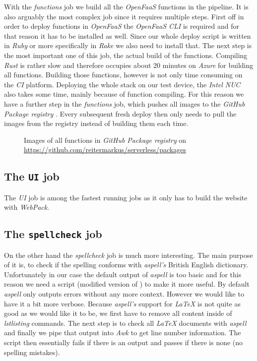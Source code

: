 With the \textit{functions} job we build all the \textit{OpenFaaS} functions in the pipeline. It is
also arguably the most complex job since it requires multiple steps. First off in order to deploy
functions in \textit{OpenFaaS} the \textit{OpenFaaS CLI} \cite{faas-cli} is required and for that
reason it has to be installed as well. Since our whole deploy script is written in \textit{Ruby} or
more specifically in \textit{Rake} we also need to install that. The next step is the most important
one of this job, the actual build of the functions. Compiling \textit{Rust} is rather slow and
therefore occupies about 20 minutes on \textit{Azure} for building all functions. Building those
functions, however is not only time consuming on the \textit{CI} platform. Deploying the whole stack
on our test device, the \textit{Intel NUC} also takes some time, mainly because of function
compiling. For this reason we have a further step in the \textit{functions} job, which pushes all
images to the \textit{GitHub Package registry} \cite{github-registry}. Every subsequent fresh deploy
then only needs to pull the images from the registry instead of building them each time.

\begin{figure}[H]
  \centering
  \caption{Images of all functions in \textit{GitHub Package registry} on \url{https://github.com/reitermarkus/serverless/packages}}
\end{figure}

\subsection{The \texttt{UI} job}

The \textit{UI} job is among the fastest running jobs as it only has to build the website with
\textit{WebPack}.

\subsection{The \texttt{spellcheck} job}

On the other hand the \textit{spellcheck} job is much more interesting. The main purpose of it is,
to check if the spelling conforms with \textit{aspell's} British English dictionary. Unfortunately
in our case the default output of \textit{aspell} is too basic and for this reason we need a script
(modified version of \cite{aspell-awk}) to make it more useful. By default \textit{aspell} only
outputs errors without any more context. However we would like to have it a bit more verbose.
Because \textit{aspell's} support for \textit{LaTeX} is not quite as good as we would like it to be,
we first have to remove all content inside of \textit{lstlisting} commands. The next step is to
check all \textit{LaTeX} documents with \textit{aspell} and finally we pipe that output into
\textit{Awk} to get line number information. The script then essentially fails if there is an output
and passes if there is none (no spelling mistakes).

